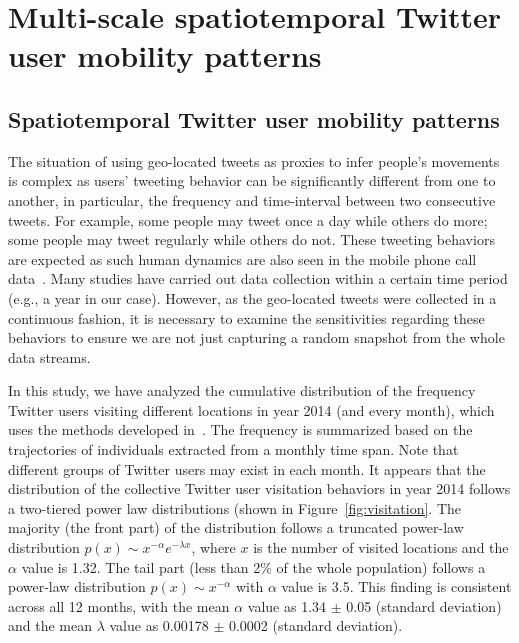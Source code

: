 \documentclass[ijgi,article,submit,moreauthors,pdftex,10pt,a4paper]{mdpi}
\theoremstyle{mdpi}
\newcounter{ex}
\newcounter{re}
\theoremstyle{mdpidefinition}
\begin{document}
\section{Multi-scale spatiotemporal Twitter user mobility patterns}
\subsection{Spatiotemporal Twitter user mobility patterns}
The situation of using geo-located tweets as proxies to infer people's movements is complex as users' tweeting behavior can be significantly different from one to another, in particular, the frequency and time-interval between two consecutive tweets.
For example, some people may tweet once a day while others do more; some people may tweet regularly while others do not.  
These tweeting behaviors are expected as such human dynamics are also seen in the mobile phone call data~\cite{gonzalez2008understanding}. 
Many studies have carried out data collection within a certain time period (e.g., a year in our case).
However, as the geo-located tweets were collected in a continuous fashion, it is necessary to examine the sensitivities regarding these behaviors to ensure we are not just capturing a random snapshot from the whole data streams. 

In this study, we have analyzed the cumulative distribution of the frequency Twitter users visiting different locations in year 2014 (and every month), which uses the methods developed in~\cite{clauset2009power}. 
The frequency is summarized based on the trajectories of individuals extracted from a monthly time span.
Note that different groups of Twitter users may exist in each month. 
It appears that the distribution of the collective Twitter user visitation behaviors in year 2014 follows a two-tiered power law distributions (shown in Figure~\ref{fig:visitation}.
The majority (the front part) of the distribution follows a truncated power-law distribution $p(x)\sim x^{-\alpha}e^{-\lambda x}$, where $x$ is the number of visited locations and the $\alpha$ value is 1.32.
The tail part (less than 2$\%$ of the whole population) follows a power-law distribution  $p(x)\sim x^{-\alpha}$ with $\alpha$ value is 3.5.
This finding is consistent across all 12 months, with the mean $\alpha$ value as 1.34 $ \pm$  0.05 (standard deviation) and the mean $\lambda$ value as 0.00178 $ \pm$  0.0002 (standard deviation).
\end{document}
